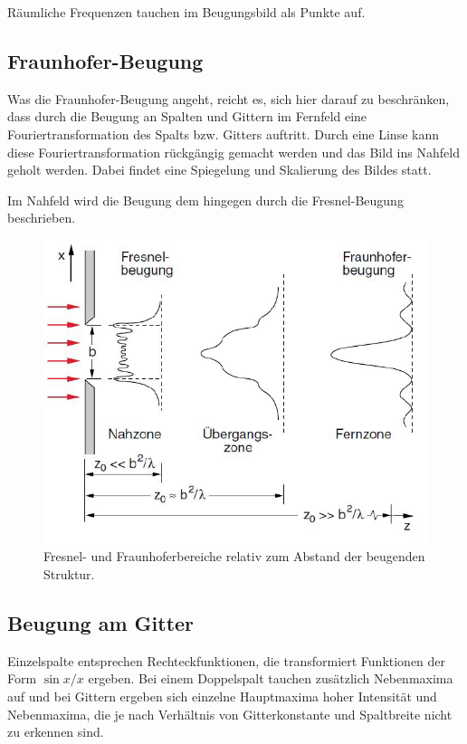 \documentclass[
	a4paper,
	12pt,
	pagesize,
	ngerman
]{scrartcl}
\begin{document}
	Räumliche Frequenzen tauchen im Beugungsbild als Punkte auf.

	\subsection{Fraunhofer-Beugung}
	\label{sec_fraunhofer}

	Was die Fraunhofer-Beugung angeht, reicht es, sich hier darauf zu beschränken, dass durch die Beugung an Spalten und Gittern im Fernfeld eine Fouriertransformation des Spalts bzw. Gitters auftritt.
	Durch eine Linse kann diese Fouriertransformation rückgängig gemacht werden und das Bild ins Nahfeld geholt werden.
	Dabei findet eine Spiegelung und Skalierung des Bildes statt.

	Im Nahfeld wird die Beugung dem hingegen durch die Fresnel-Beugung beschrieben.

	\begin{figure}[H]
			\includegraphics[width=0.75\linewidth]{img/fraunfresnel}
			\caption{
				Fresnel- und Fraunhoferbereiche relativ zum Abstand der beugenden Struktur. \cite{Anleitung}
			}
			\label{fig_fraunfresnel}
	\end{figure}

	\subsection{Beugung am Gitter}
	\label{sec_gitterbeug}

	Einzelspalte entsprechen Rechteckfunktionen, die transformiert Funktionen der Form $\sin{x}/x$ ergeben.
	Bei einem Doppelspalt tauchen zusätzlich Nebenmaxima auf und bei Gittern ergeben sich einzelne Hauptmaxima hoher Intensität und Nebenmaxima, die je nach Verhältnis von Gitterkonstante und Spaltbreite nicht zu erkennen sind.
\end{document}
